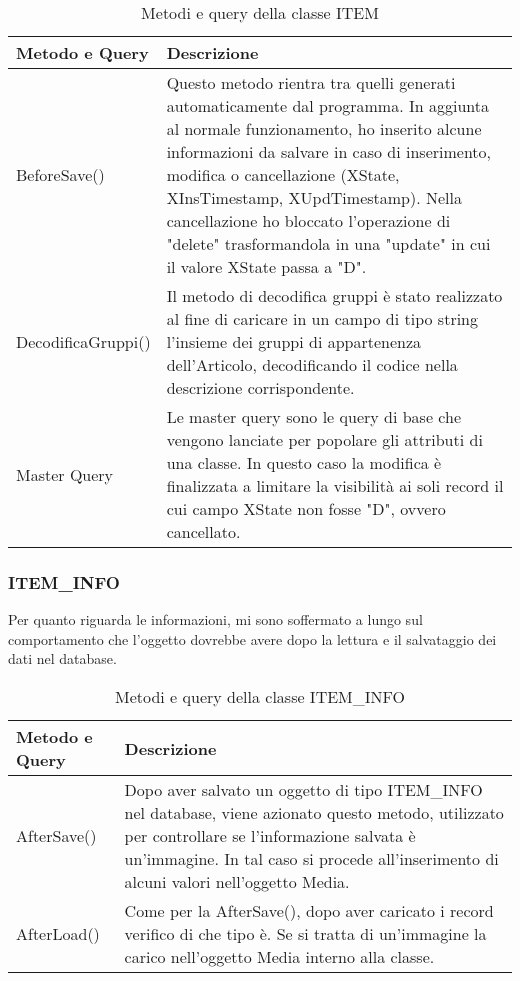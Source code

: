 \begin{table}[h]
	
	\centering
	\begin{tabular}{ p{3cm}|p{} }
		\hline
		\textbf{Metodo e Query} & \textbf{Descrizione}\\
		\hline
		BeforeSave() & Questo metodo rientra tra quelli generati automaticamente dal programma. In aggiunta al normale funzionamento, ho inserito alcune informazioni da salvare in caso di inserimento, modifica o cancellazione (XState, XInsTimestamp, XUpdTimestamp). Nella cancellazione ho bloccato l'operazione di "delete" trasformandola in una "update" in cui il valore XState passa a "D".\\
		\hline
		DecodificaGruppi() & Il metodo di decodifica gruppi è stato realizzato al fine di caricare in un campo di tipo string l'insieme dei gruppi di appartenenza dell'Articolo, decodificando il codice nella descrizione corrispondente.\\
		\hline
		Master Query & Le master query sono le query di base che vengono lanciate per popolare gli attributi di una classe. In questo caso la modifica è finalizzata a limitare la visibilità ai soli record il cui campo XState non fosse "D", ovvero cancellato.\\
		
	\end{tabular}
\caption{Metodi e query della classe ITEM}
\end{table}



\subsubsection{ITEM\_INFO}
Per quanto riguarda le informazioni, mi sono soffermato a lungo sul comportamento che l'oggetto dovrebbe avere dopo la lettura e il salvataggio dei dati nel database. 
	\begin{table}[h]
			\centering
			\begin{tabular}{ p{3cm}|p{} }
			\hline
			\textbf{Metodo e Query} & \textbf{Descrizione}\\
			\hline
			AfterSave() & Dopo aver salvato un oggetto di tipo ITEM\_INFO nel database, viene azionato questo metodo, utilizzato per controllare se l'informazione salvata è un'immagine. In tal  caso si procede all'inserimento di alcuni valori nell'oggetto Media.\\
			\hline
			AfterLoad() & Come per la AfterSave(), dopo aver caricato i record verifico di che tipo è. Se si tratta di un'immagine la carico nell'oggetto Media interno alla classe.\\
			
		\end{tabular}
	\caption{Metodi e query della classe ITEM\_INFO}
	\end{table}


